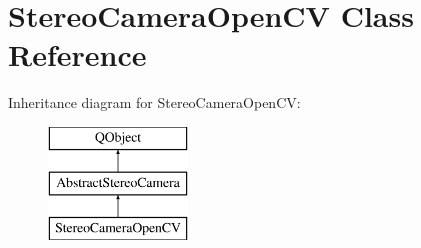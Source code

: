 \hypertarget{class_stereo_camera_open_c_v}{}\section{Stereo\+Camera\+Open\+C\+V Class Reference}
\label{class_stereo_camera_open_c_v}
Inheritance diagram for Stereo\+Camera\+Open\+C\+V\+:\begin{figure}[H]
\begin{center}
\leavevmode
\includegraphics[height=3.000000cm]{class_stereo_camera_open_c_v}
\end{center}
\end{figure}
